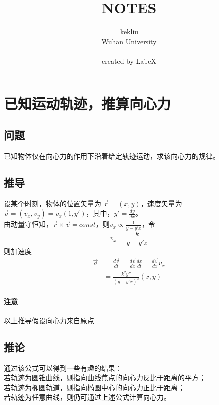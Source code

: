 \documentclass{ctexart}
\title{NOTES}
\author{kekliu\\Wuhan University\\\\created by \LaTeX}
\begin{document}
	
	\maketitle
	\thispagestyle{empty}
	\pagebreak
	
	\tableofcontents
	\thispagestyle{empty}
	\pagebreak
	
	\setcounter{page}{1}
	
	
	
	
	\section{已知运动轨迹，推算向心力}
	\subsection{问题}
	已知物体仅在向心力的作用下沿着给定轨迹运动，求该向心力的规律。
	\subsection{推导}
	设某个时刻，物体的位置矢量为 $ \vec{r} =(x,y) $，速度矢量为 $ \vec{v}=(v_x,v_y)=v_x (1,y') $，其中，$ y'=\frac{dy}{dx} $。
	\\
	由动量守恒知，$ \vec{r}\times\vec{v}=const $，则$ v_x\propto\frac{1}{y-y'x} $，令
	\begin{equation} v_x=\frac{k}{y-y'x} \end{equation}
	则加速度
	\begin{equation}
	\begin{split}
	\vec{a} &= \frac{d\vec{v}}{dt} = \frac{d\vec{v}}{dx} \frac{dx}{dt} = \frac{d\vec{v}}{dx} v_x \\
	&= \frac{k^2 y''}{(y-y'x)^3} (x,y)
	\end{split}
	\end{equation}
	\paragraph{注意}
	以上推导假设向心力来自原点
	\subsection{推论}
	\noindent
	通过该公式可以得到一些有趣的结果：
	\\若轨迹为圆锥曲线，则指向曲线焦点的向心力反比于距离的平方；
	\\若轨迹为椭圆轨道，则指向椭圆中心的向心力正比于距离；
	\\若轨迹为任意曲线，则仍可通过上述公式计算向心力。
\end{document}
